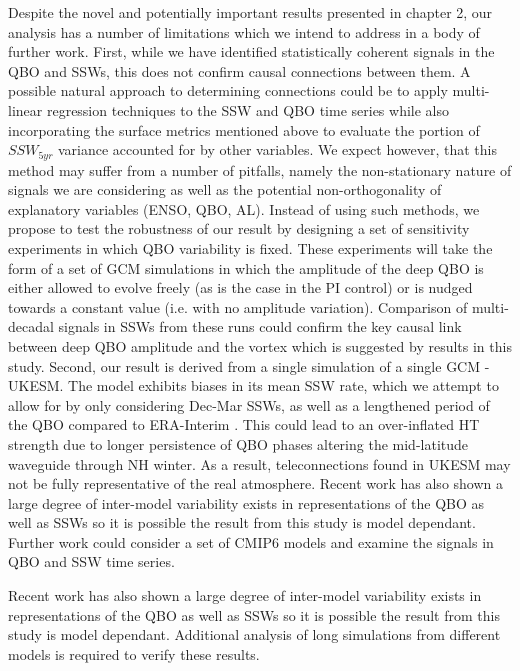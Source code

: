 Despite the novel and potentially important results presented in chapter 2, our analysis has a number of limitations which we intend to address in a body of further work. First, while we have identified statistically coherent signals in the QBO and SSWs, this does not confirm causal connections between them. A possible natural approach to determining connections could be to apply multi-linear regression techniques to the SSW and QBO time series while also incorporating the surface metrics mentioned above to evaluate the portion of $SSW_{5yr}$ variance accounted for by other variables. We expect however, that this method may suffer from a number of pitfalls, namely the non-stationary nature of signals we are considering as well as the potential non-orthogonality of explanatory variables (ENSO, QBO, AL). Instead of using such methods, we propose to test the robustness of our result by designing a set of sensitivity experiments in which QBO variability is fixed. These experiments will take the form of a set of GCM simulations in which the amplitude of the deep QBO is either allowed to evolve freely (as is the case in the PI control) or is nudged towards a constant value (i.e. with no amplitude variation). Comparison of multi-decadal signals in SSWs from these runs could confirm the key causal link between deep QBO amplitude and the vortex which is suggested by results in this study. Second, our result is derived from a single simulation of a single GCM - UKESM. The model exhibits biases in its mean SSW rate, which we attempt to allow for by only considering Dec-Mar SSWs, as well as a lengthened period of the QBO compared to ERA-Interim \citep{Bushell2020}. This could lead to an over-inflated HT strength due to longer persistence of QBO phases altering the mid-latitude waveguide through NH winter. As a result, teleconnections found in UKESM may not be fully representative of the real atmosphere. Recent work has also shown a large degree of inter-model variability exists in representations of the QBO as well as SSWs \citep{Bushell2020,ayarzag2020} so it is possible the result from this study is model dependant. Further work could consider a set of CMIP6 models and examine the signals in QBO and SSW time series. 

Recent work has also shown a large degree of inter-model variability exists in representations of the QBO as well as SSWs \citep{Bushell2020,Ayarz2020} so it is possible the result from this study is model dependant. Additional analysis of long simulations from different models is required to verify these results. 


